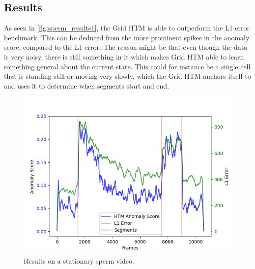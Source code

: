 \subsection{Results}
As seen in \autoref{fig:sperm_results1}, the Grid HTM is able to outperform the L1 error benchmark. This can be deduced from the more prominent spikes in the anomaly score, compared to the L1 error. The reason might be that even though the data is very noisy, there is still something in it which makes Grid HTM able to learn something general about the current state. This could for instance be a single cell that is standing still or moving very slowly, which the Grid HTM anchors itself to and uses it to determine when segments start and end.
\begin{figure}[H]
    \centering
    \includegraphics[width=\textwidth]{resources/experiments/sperm/sperm_result1.png}
    \caption{Results on a stationary sperm video.}
    \label{fig:sperm_results1}
\end{figure}

